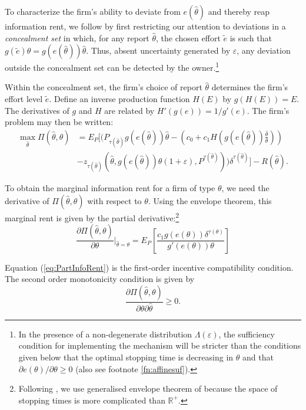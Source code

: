 \documentclass[12pt]{article}
\begin{document}
To characterize the firm's ability to deviate from $e(\hat{\theta})$ and thereby reap information rent, we follow \citet{bib:laffonttirole1986} by first restricting our attention to deviations in a {\it concealment set} in which, for any report $\hat{\theta}$, the chosen effort $\tilde{e}$ is such that $g(\tilde{e})\theta=g(e(\hat{\theta}))\hat{\theta}$. Thus, absent uncertainty generated by $\varepsilon$, any deviation outside the concealment set can be detected by the owner.\footnote{In the presence of a non-degenerate distribution $\Lambda(\varepsilon)$, the sufficiency condition for implementing the mechanism will be stricter than the conditions given below that the optimal stopping time is decreasing in $\theta$ and that $\partial e(\theta)/\partial\theta\geq0$ (also see footnote \ref{fn:affinesuf}).}

Within the concealment set, the firm's choice of report $\hat{\theta}$ determines the firm's effort level $\tilde{e}$. Define an inverse production function $H(E)$ by $g(H(E))=E$. The derivatives of $g$ and $H$ are related by $H'(g(e))=1/g'(e)$. The firm's problem may then be written:
\begin{align}
\max_{\hat{\theta}}\Pi(\hat{\theta},\theta)&=E_P[(P_{\tau(\hat{\theta})} g(e(\hat{\theta}))\hat{\theta}-(c_0+c_1H(g(e(\hat{\theta}))\frac{\hat{\theta}}{\theta})) \nonumber \\
&-z_{\tau(\hat{\theta})}(\hat{\theta},g(e(\hat{\theta}))\hat{\theta}(1+\varepsilon),P^{\tau(\hat{\theta})}))\delta^{\tau(\hat{\theta})}]-R(\hat{\theta}). \label{eq:firmrestricted}
\end{align}

To obtain the marginal information rent for a firm of type $\theta$, we need the derivative of $\Pi(\hat{\theta},\theta)$ with respect to $\theta$. Using the envelope theorem, this marginal rent is given by the partial derivative:\footnote{Following \citet{bib:board}, we use generalised envelope theorem of \citet{bib:milgromsegal} because the space of stopping times is more complicated than $\mathbb{R}^+$.}
\begin{equation}
\frac{\partial\Pi(\hat{\theta},\theta)}{\partial\theta}\bigg|_{\hat{\theta}=\theta}=
E_P\left[\frac{c_1g(e(\theta))\delta^{\tau(\theta)}}{g'(e(\theta))\theta}\right] \label{eq:PartInfoRent}
\end{equation}

Equation (\ref{eq:PartInfoRent}) is the first-order incentive compatibility condition. The second order monotonicity condition is given by
\begin{equation}
\frac{\partial\Pi(\hat{\theta},\theta)}{\partial\theta\partial\hat{\theta}}\geq0. \label{eq:ASOC_SOC}
\end{equation}
\end{document}
